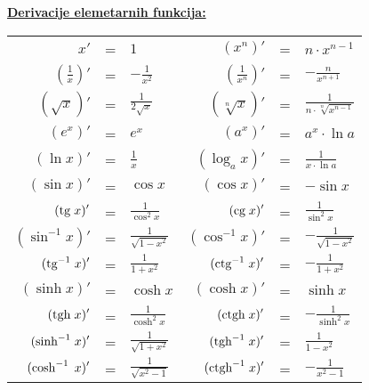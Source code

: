 \documentclass[12pt,oneside,a4paper]{report}
\begin{document}
\vspace{4mm}
\noindent
\underline{\textbf{Derivacije elemetarnih funkcija:}}\\
\begin{center}
\begin{tabular}{|rcl|rcl|}
\hline
$\displaystyle x'$  & = &  $1$ & $(x^n)'$  & = &  $n\cdot x^{n-1}$\\ 
$\displaystyle \left(\frac 1x\right)'$  & = &  $\displaystyle -\frac 1{x^2}$ & $\displaystyle \left(\frac 1{x^n}\right)'$  & = &  $\displaystyle -\frac n{x^{n+1}}$\\ 
$\displaystyle \left(\sqrt{x}\right)'$  & = &  $\displaystyle \frac1{2\sqrt x}$ & $\displaystyle
\left(\sqrt[n]{x}\right)'$  & = &  $\displaystyle \frac1{n\cdot \sqrt[n]{x^{n-1}}}$\\ 
\hline
$\displaystyle \left(e^x\right)'$  & = &  $\displaystyle e^x$ & $\displaystyle \left(a^x\right)'$  & = &  $\displaystyle a^x\cdot \ln a$\\ 
$\displaystyle (\ln x)'$  & = &  $\displaystyle \frac 1x$ & $\displaystyle (\log_a x)'$  & = &  $\displaystyle \frac 1{x \cdot \ln a}$\\ 
\hline
$\displaystyle (\sin x)'$  & = &  $\displaystyle \cos x$ & $\displaystyle (\cos x)'$  & = &  $\displaystyle -\sin x$\\
$\displaystyle (\textrm{tg}\hspace{1mm}x)'$  & = &  $\displaystyle \frac 1{\cos ^2 x}$ & $\displaystyle (\textrm{cg}\hspace{1mm}x)'$  & = &  $\displaystyle \frac 1{\sin ^2 x}$\\
$\displaystyle (\sin^{-1} x)'$  & = &  $\displaystyle \frac1{\sqrt{1-x^2}}$ & $\displaystyle (\cos^{-1} x)'$  & = &  $\displaystyle -\frac1{\sqrt{1-x^2}}$ \\
$\displaystyle (\textrm{tg}^{-1}\hspace{1mm}x)'$  & = &  $\displaystyle \frac1{1+x^2}$ & $\displaystyle (\textrm{ctg}^{-1}\hspace{1mm}x)'$  & = &  $\displaystyle -\frac1{1+x^2}$\\
\hline
$\displaystyle (\sinh x)'$  & = &  $\displaystyle \cosh x$ & $\displaystyle (\cosh x)'$  & = &  $\displaystyle \sinh x$\\
$\displaystyle (\textrm{tgh}\hspace{1mm}x)'$ & = & $\displaystyle \frac1{\cosh^2x}$ & $\displaystyle (\textrm{ctgh}\hspace{1mm}x)'$ & = & $\displaystyle -\frac1{\sinh^2x}$\\
$\displaystyle (\textrm{sinh}^{-1}\hspace{1mm}x)'$ & = & $\displaystyle \frac1{\sqrt{1+x^2}}$ & $\displaystyle (\textrm{tgh}^{-1}\hspace{1mm}x)'$ & = & $\displaystyle \frac1{1-x^2}$\\
$\displaystyle (\cosh^{-1}\hspace{1mm}x)'$ & = & $\displaystyle \frac1{\sqrt{x^2-1}}$ & $\displaystyle (\textrm{ctgh}^{-1}\hspace{1mm}x)'$ & = & $\displaystyle -\frac1{x^2-1}$\\
\hline
\end{tabular}
\end{center}
\end{document}
